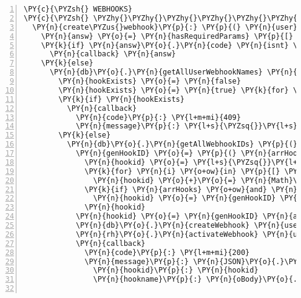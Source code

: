 \begin{Verbatim}[fontsize=\scriptsize,commandchars=\\\{\},numbers=left,firstnumber=1,stepnumber=1]
\PY{c}{\PYZsh{} WEBHOOKS}
\PY{c}{\PYZsh{} \PYZhy{}\PYZhy{}\PYZhy{}\PYZhy{}\PYZhy{}\PYZhy{}\PYZhy{}\PYZhy{}}
  \PY{n}{create\PYZus{}webhook}\PY{p}{:} \PY{p}{(} \PY{n}{user}\PY{p}{,} \PY{n}{oBody}\PY{p}{,} \PY{n}{callback} \PY{p}{)} \PY{o}{\PYZhy{}}\PY{o}{\PYZgt{}}
    \PY{n}{answ} \PY{o}{=} \PY{n}{hasRequiredParams} \PY{p}{[} \PY{l+s}{\PYZsq{}}\PY{l+s}{hookname}\PY{l+s}{\PYZsq{}} \PY{p}{]}\PY{p}{,} \PY{n}{oBody}
    \PY{k}{if} \PY{n}{answ}\PY{o}{.}\PY{n}{code} \PY{n}{isnt} \PY{l+m+mi}{200}
      \PY{n}{callback} \PY{n}{answ}
    \PY{k}{else}
      \PY{n}{db}\PY{o}{.}\PY{n}{getAllUserWebhookNames} \PY{n}{user}\PY{o}{.}\PY{n}{username}\PY{p}{,} \PY{p}{(} \PY{n}{err}\PY{p}{,} \PY{n}{arrHooks} \PY{p}{)} \PY{o}{=}\PY{o}{\PYZgt{}}
        \PY{n}{hookExists} \PY{o}{=} \PY{n}{false}
        \PY{n}{hookExists} \PY{o}{=} \PY{n}{true} \PY{k}{for} \PY{n}{hookid}\PY{p}{,} \PY{n}{hookname} \PY{n}{of} \PY{n}{arrHooks} \PY{n}{when} \PY{n}{hookname} \PY{o+ow}{is} \PY{n}{oBody}\PY{o}{.}\PY{n}{hookname}
        \PY{k}{if} \PY{n}{hookExists}
          \PY{n}{callback}
            \PY{n}{code}\PY{p}{:} \PY{l+m+mi}{409}
            \PY{n}{message}\PY{p}{:} \PY{l+s}{\PYZsq{}}\PY{l+s}{Webhook already existing: }\PY{l+s}{\PYZsq{}} \PY{o}{+} \PY{n}{oBody}\PY{o}{.}\PY{n}{hookname}
        \PY{k}{else}
          \PY{n}{db}\PY{o}{.}\PY{n}{getAllWebhookIDs} \PY{p}{(} \PY{n}{err}\PY{p}{,} \PY{n}{arrHooks} \PY{p}{)} \PY{o}{\PYZhy{}}\PY{o}{\PYZgt{}}
            \PY{n}{genHookID} \PY{o}{=} \PY{p}{(} \PY{n}{arrHooks} \PY{p}{)} \PY{o}{\PYZhy{}}\PY{o}{\PYZgt{}}
              \PY{n}{hookid} \PY{o}{=} \PY{l+s}{\PYZsq{}}\PY{l+s}{\PYZsq{}}
              \PY{k}{for} \PY{n}{i} \PY{o+ow}{in} \PY{p}{[} \PY{l+m+mf}{0.}\PY{o}{.}\PY{l+m+mi}{1} \PY{p}{]}
                \PY{n}{hookid} \PY{o}{+}\PY{o}{=} \PY{n}{Math}\PY{o}{.}\PY{n}{random}\PY{p}{(}\PY{p}{)}\PY{o}{.}\PY{n}{toString}\PY{p}{(} \PY{l+m+mi}{36} \PY{p}{)}\PY{o}{.}\PY{n}{substring} \PY{l+m+mi}{2}
              \PY{k}{if} \PY{n}{arrHooks} \PY{o+ow}{and} \PY{n}{arrHooks}\PY{o}{.}\PY{n}{indexOf}\PY{p}{(} \PY{n}{hookid} \PY{p}{)} \PY{o}{\PYZgt{}} \PY{o}{\PYZhy{}}\PY{l+m+mi}{1}
                \PY{n}{hookid} \PY{o}{=} \PY{n}{genHookID} \PY{n}{arrHooks}
              \PY{n}{hookid}
            \PY{n}{hookid} \PY{o}{=} \PY{n}{genHookID} \PY{n}{arrHooks}
            \PY{n}{db}\PY{o}{.}\PY{n}{createWebhook} \PY{n}{user}\PY{o}{.}\PY{n}{username}\PY{p}{,} \PY{n}{hookid}\PY{p}{,} \PY{n}{oBody}\PY{o}{.}\PY{n}{hookname}
            \PY{n}{rh}\PY{o}{.}\PY{n}{activateWebhook} \PY{n}{user}\PY{o}{.}\PY{n}{username}\PY{p}{,} \PY{n}{hookid}\PY{p}{,} \PY{n}{oBody}\PY{o}{.}\PY{n}{hookname}
            \PY{n}{callback}
              \PY{n}{code}\PY{p}{:} \PY{l+m+mi}{200}
              \PY{n}{message}\PY{p}{:} \PY{n}{JSON}\PY{o}{.}\PY{n}{stringify}
                \PY{n}{hookid}\PY{p}{:} \PY{n}{hookid}
                \PY{n}{hookname}\PY{p}{:} \PY{n}{oBody}\PY{o}{.}\PY{n}{hookname}


\end{Verbatim}
